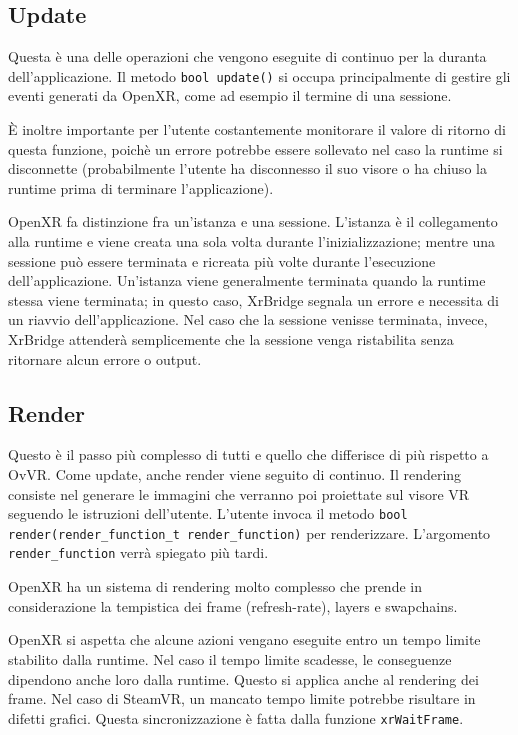 \documentclass[twoside]{supsistudent}
\begin{document}
\subsection{Update}

Questa è una delle operazioni che vengono eseguite di continuo per la duranta dell'applicazione. Il metodo \texttt{bool update()} si occupa principalmente di gestire gli eventi generati da OpenXR, come ad esempio il termine di una sessione.

È inoltre importante per l'utente costantemente monitorare il valore di ritorno di questa funzione, poichè un errore potrebbe essere sollevato nel caso la runtime si disconnette (probabilmente l'utente ha disconnesso il suo visore o ha chiuso la runtime prima di terminare l'applicazione).

OpenXR fa distinzione fra un'istanza e una sessione. L'istanza è il collegamento alla runtime e viene creata una sola volta durante l'inizializzazione; mentre una sessione può essere terminata e ricreata più volte durante l'esecuzione dell'applicazione. Un'istanza viene generalmente terminata quando la runtime stessa viene terminata; in questo caso, XrBridge segnala un errore e necessita di un riavvio dell'applicazione. Nel caso che la sessione venisse terminata, invece, XrBridge attenderà semplicemente che la sessione venga ristabilita senza ritornare alcun errore o output.

\subsection{Render}

Questo è il passo più complesso di tutti e quello che differisce di più rispetto a OvVR. Come update, anche render viene seguito di continuo. Il rendering consiste nel generare le immagini che verranno poi proiettate sul visore VR seguendo le istruzioni dell'utente. L'utente invoca il metodo \texttt{bool render(render\_function\_t render\_function)} per renderizzare. L'argomento \texttt{render\_function} verrà spiegato più tardi.

OpenXR ha un sistema di rendering molto complesso che prende in considerazione la tempistica dei frame (refresh-rate), layers e swapchains.

OpenXR si aspetta che alcune azioni vengano eseguite entro un tempo limite stabilito dalla runtime. Nel caso il tempo limite scadesse, le conseguenze dipendono anche loro dalla runtime. Questo si applica anche al rendering dei frame. Nel caso di SteamVR, un mancato tempo limite potrebbe risultare in difetti grafici. Questa sincronizzazione è fatta dalla funzione \texttt{xrWaitFrame}.
\end{document}
